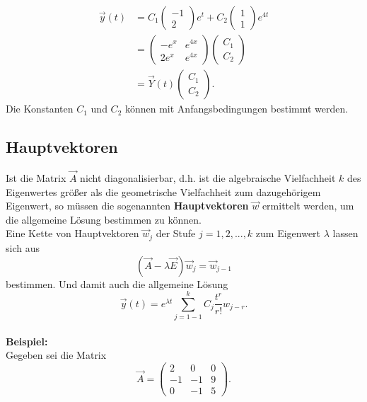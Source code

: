 \begin{align*}
\vec y(t) &= C_1 \begin{pmatrix}-1 \\ 2 \end{pmatrix} e^t + C_2  \begin{pmatrix}1 \\ 1 \end{pmatrix} e^{4t} \\
          &=  \begin{pmatrix}-e^x & e^{4x} \\ 2e^x & e^{4x} \end{pmatrix}  \begin{pmatrix} C_1 \\ C_2 \end{pmatrix} \\
          &= \vec Y(t) \begin{pmatrix} C_1 \\ C_2 \end{pmatrix}.
\end{align*}
Die Konstanten $C_1$ und $C_2$ k\"onnen mit Anfangsbedingungen bestimmt werden.

\subsection*{Hauptvektoren}
Ist die Matrix $\vec A$ nicht diagonalisierbar, d.h. ist die algebraische Vielfachheit $k$ des Eigenwertes gr\"o\ss er als die geometrische Vielfachheit zum dazugeh\"origem Eigenwert, so m\"ussen die sogenannten \textbf{Hauptvektoren} $\vec w$ ermittelt werden, um die allgemeine L\"osung bestimmen zu k\"onnen. \\

\noindent
Eine Kette von Hauptvektoren $\vec w_j$ der Stufe $j=1,2,...,k$ zum Eigenwert $\lambda$ lassen sich aus
$$
(\vec A - \lambda \vec E) \vec w_j = \vec w_{j-1}
$$
bestimmen. Und damit auch die allgemeine L\"osung 
$$
\vec y(t) = e^{\lambda t} \sum_{j=1-1}^{k} C_j \dfrac{t^r}{r!} w_{j-r}.
$$\\

\noindent
\textbf{Beispiel:}\\
Gegeben sei die Matrix
$$
\vec A = \begin{pmatrix}
2 & 0 & 0 \\
-1 & -1 & 9 \\
0 & -1 & 5 
\end{pmatrix}.
$$

